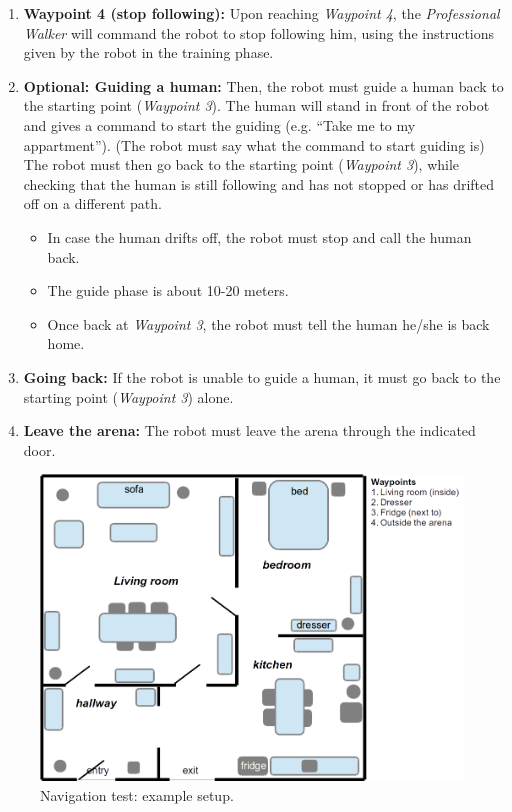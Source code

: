 \begin{enumerate}
	\item \textbf{Waypoint 4 (stop following):} Upon reaching \textit{Waypoint 4}, 
	  the \textit{Professional Walker} will command the robot to stop following him, using the instructions given by the robot in the training phase.
	
	\item \textbf{Optional: Guiding a human:} Then, the robot must guide a human back to the starting point (\textit{Waypoint 3}).
	The human will stand in front of the robot and gives a command to start the guiding (e.g. ``Take me to my appartment'').
	(The robot must say what the command to start guiding is)
	The robot must then go back to the starting point (\textit{Waypoint 3}), while checking that the human is still following and has not stopped or has drifted off on a different path.
	
	\begin{itemize}
	 \item In case the human drifts off, the robot must stop and call the human back. 
	 \item The guide phase is about 10-20 meters.
	 \item Once back at \textit{Waypoint 3}, the robot must tell the human he/she is back home. 
	\end{itemize}
	
	\item \textbf{Going back:} If the robot is unable to guide a human, it must go back to the starting point (\textit{Waypoint 3}) alone. 
	
	\item \textbf{Leave the arena:} The robot must leave the arena through the indicated door.
\end{enumerate}

\begin{figure}[tbp]
	\centering
	\includegraphics[width=0.5\columnwidth]{images/navigation.png}
	\caption{Navigation test: example setup.}
	\label{fig:restaurant}
\end{figure}

